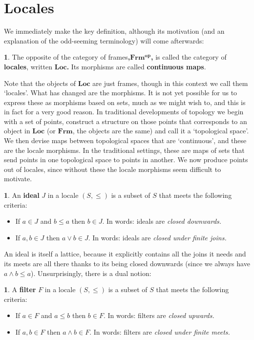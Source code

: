 \documentclass[oneside,english]{amsbook}
\numberwithin{section}{chapter}
\theoremstyle{plain}
\theoremstyle{definition}
\newtheorem{defn}[thm]{\protect\definitionname}
\providecommand{\definitionname}{Definition}
\begin{document}
\section{Locales}

We immediately make the key definition, although its motivation (and an explanation of the odd-seeming terminology) will come afterwards: 

\begin{defn} 
	The opposite of the category of frames\textbf{,$\mathbf{Frm^{op}}$,} is called the category of \textbf{locales}, written \textbf{$\mathbf{Loc}$. }Its morphisms are called \textbf{continuous maps}. 
\end{defn} 

Note that the objects of \textbf{$\mathbf{Loc}$ }are just frames, though in this context we call them `locales'. What has changed are the morphisms. It is not yet possible for us to express these as morphisms based on sets, much as we might wish to, and this is in fact for a very good reason. In traditional developments of topology we begin with a set of points, construct a structure on those points that corresponds to an object in \textbf{$\mathbf{Loc}$} (or\textbf{ $\mathbf{Frm}$}, the objects are the same) and call it a `topological space'. We then devise maps between topological spaces that are `continuous', and these are the locale morphisms. In the traditional settings, these are maps of sets that send points in one topological space to points in another. We now produce points out of locales, since without these the locale morphisms seem difficult to motivate. 

\begin{defn} 
	An \textbf{ideal} $J$ in a locale $(S,\le)$ is a subset of $S$ that meets the following criteria: 
	\begin{itemize} 
		\item If $a\in J$ and $b\le a$ then $b\in J$. In words: ideals are \emph{closed downwards.} 
		\item If $a,b\in J$ then $a\lor b\in J$. In words: ideals are \emph{closed under finite joins.} 
	\end{itemize} 
\end{defn}

An ideal is itself a lattice, because it explicitly contains all the joins it needs and its meets are all there thanks to its being closed downwards (since we always have $a\land b\le a$). Unsurprisingly, there is a dual notion: 

\begin{defn} 
	A \textbf{filter} $F$ in a locale $(S,\le)$ is a subset of $S$ that meets the following criteria: 
	\begin{itemize} 
		\item If $a\in F$ and $a\le b$ then $b\in F$. In words: filters are \emph{closed upwards.} 
		\item If $a,b\in F$ then $a\land b\in F$. In words: filters are \emph{closed under finite meets.} 
	\end{itemize} 
\end{defn} 
\end{document}
